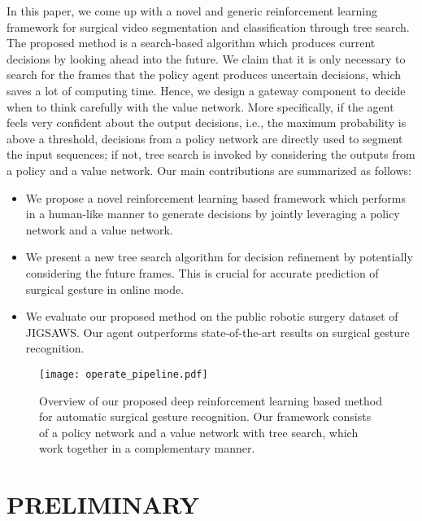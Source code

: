 \documentclass[letterpaper, 10 pt, conference]{ieeeconf}
\begin{document}
In this paper, we come up with a novel and generic reinforcement learning framework for surgical video segmentation and classification through tree search. The proposed method is a search-based algorithm which produces current decisions by looking ahead into the future. We claim that it is only necessary to search for the frames that the policy agent produces uncertain decisions, which saves a lot of computing time. Hence, we design a gateway component to decide when to think carefully with the value network. More specifically, if the agent feels very confident about the output decisions, i.e., the maximum probability is above a threshold, decisions from a policy network are directly used to segment the input sequences; if not, tree search is invoked by considering the outputs from a policy and a value network. Our main contributions are summarized as follows: 
\begin{itemize}
	\item We propose a novel reinforcement learning based framework which performs in a human-like manner to generate decisions by jointly leveraging a policy network and a value network.
	\item We present a new tree search algorithm for decision refinement by potentially considering the future frames. This is crucial for accurate prediction of surgical gesture in online mode.
	\item We evaluate our proposed method on the public robotic surgery dataset of JIGSAWS. Our agent outperforms state-of-the-art results on surgical gesture recognition.
\end{itemize}

\begin{figure*}[t]
\centering
	\texttt{[image: operate\_pipeline.pdf]}
	\vspace{-3mm}
	\caption{Overview of our proposed deep reinforcement learning based method for automatic surgical gesture recognition. Our framework consists of a policy network and a value network with tree search, which work together in a complementary manner.}
	\label{operate_pipeline}
	\vspace{-3mm}
\end{figure*}

\section{PRELIMINARY}
\label{PRELIMINARY}
\end{document}
